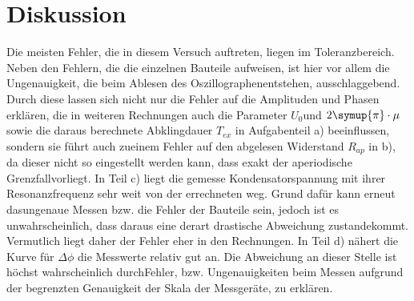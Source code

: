 \section{Diskussion}
\label{sec:Diskussion}
    Die meisten Fehler, die in diesem Versuch auftreten, liegen im Toleranzbereich.
    Neben den Fehlern, die die einzelnen Bauteile aufweisen, ist hier vor allem die Ungenauigkeit, die beim Ablesen des Oszillographenentstehen, ausschlaggebend.
    Durch diese lassen sich nicht nur die Fehler auf die Amplituden und Phasen erklären, die in weiteren Rechnungen auch die Parameter $U_0$und $2\symup{\pi}\cdot \mu$ sowie die daraus berechnete Abklingdauer $T_{ex}$ in Aufgabenteil a)  beeinflussen, sondern sie führt auch zueinem Fehler auf den abgelesen Widerstand $R_{ap}$ in b), da dieser nicht so eingestellt werden kann, dass exakt der aperiodische Grenzfallvorliegt.
    In Teil c) liegt die gemesse Kondensatorspannung mit ihrer Resonanzfrequenz sehr weit von der errechneten weg. Grund dafür kann erneut dasungenaue Messen bzw. die Fehler der Bauteile sein, jedoch ist es unwahrscheinlich, dass daraus eine derart drastische Abweichung zustandekommt. Vermutlich liegt daher der Fehler eher in den Rechnungen.
    In Teil d) nähert die Kurve für $\Delta \phi$ die Messwerte relativ gut an. Die Abweichung an dieser Stelle ist höchst wahrscheinlich durchFehler, bzw. Ungenauigkeiten beim Messen aufgrund der begrenzten Genauigkeit der Skala der Messgeräte, zu erklären.